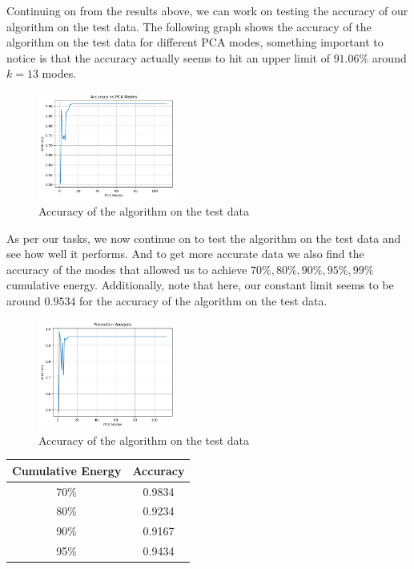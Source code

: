 \documentclass[11pt]{amsart}
\begin{document}
Continuing on from the results above, we can work on testing the accuracy of our algorithm on the test data. The following graph shows the accuracy of the algorithm on the test data for different PCA modes, something important to notice is that the accuracy actually seems to hit an upper limit of $91.06\%$ around $k = 13$ modes.

\begin{figure}[H]
    \centering
    \includegraphics[width=0.4\textwidth]{train_acc.png}
    \caption{Accuracy of the algorithm on the test data}
\end{figure}

As per our tasks, we now continue on to test the algorithm on the test data and see how well it performs. And to get more accurate data we also find the accuracy of the modes that allowed us to achieve $70\%, 80\%, 90\%, 95\%, 99\%$ cumulative energy. Additionally, note that here, our constant limit seems to be around $0.9534$ for the accuracy of the algorithm on the test data.

\begin{figure}[H]
    \centering
    \includegraphics[width=0.4\textwidth]{test_acc.png}
    \caption{Accuracy of the algorithm on the test data}
\end{figure}



\begin{table}[H]
    \centering
    \begin{tabular}{|c|c|}
    \hline
    \textbf{Cumulative Energy} & \textbf{Accuracy} \\ \hline
    70\%                       & 0.9834                            \\ \hline
    80\%                       & 0.9234                            \\ \hline
    90\%                       & 0.9167                            \\ \hline
    95\%                       & 0.9434                           \\ \hline
    \end{tabular}
\end{table}
\end{document}
